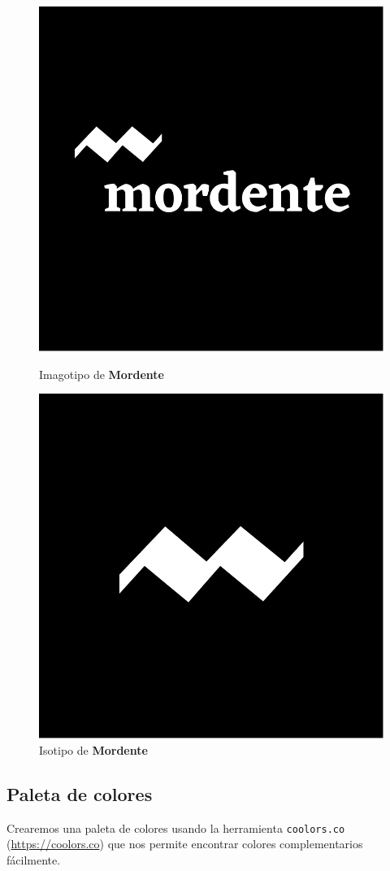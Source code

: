 \begin{figure}[]
  \centering
  \includegraphics[width=0.7\linewidth]{imagenes/logo_mordente.pdf}
  \caption{Imagotipo de \textbf{Mordente}}\label{fig:imagotipo}
\endminipage\hfill
{}%
  \centering
  \includegraphics[width=0.7\linewidth]{imagenes/isotipo_mordente.pdf}
  \caption{Isotipo de \textbf{Mordente}}\label{fig:isotipo}
\endminipage
\end{figure}

\subsection{Paleta de colores}

Crearemos una paleta de colores usando la herramienta \texttt{coolors.co} (\url{https://coolors.co}) que nos permite encontrar colores complementarios fácilmente.

